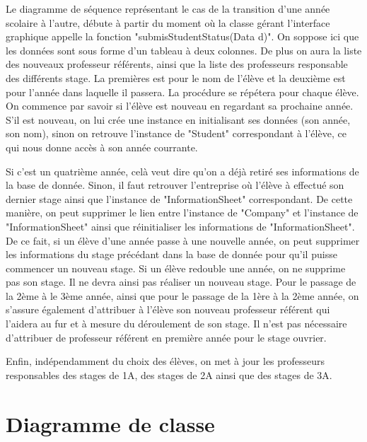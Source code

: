 \documentclass{scrreprt}
\begin{document}
	Le diagramme de séquence représentant le cas de la transition d'une année scolaire à l'autre, débute à partir du moment
où la classe gérant l'interface graphique appelle la fonction "submisStudentStatus(Data d)". On soppose ici que les données
sont sous forme d'un tableau à deux colonnes. De plus on aura la liste des nouveaux professeur référents, ainsi que la liste des professeurs
responsable des différents stage. La premières est pour le nom de l'élève et la deuxième est pour l'année dans laquelle
il passera. La procédure se répétera pour chaque élève. On commence par savoir si l'élève est nouveau en regardant sa prochaine année.
S'il est nouveau, on lui crée une instance en initialisant ses données (son année, son nom), sinon on retrouve l'instance de "Student" 
correspondant à l'élève, ce qui nous donne accès à son année courrante. 

	Si c'est un quatrième année, celà veut dire qu'on a déjà retiré ses informations de la base de donnée. Sinon, il faut retrouver 
l'entreprise où l'élève à effectué son dernier stage ainsi que l'instance de "InformationSheet" correspondant. De cette manière, on peut 
supprimer le lien entre l'instance de "Company" et l'instance de "InformationSheet" ainsi que réinitialiser les informations de 
"InformationSheet". De ce fait, si un élève d'une année passe à une nouvelle année, on peut supprimer les informations du stage précédant 
dans la base de donnée pour qu'il puisse commencer un nouveau stage. Si un élève redouble une année, on ne supprime pas son stage. Il ne 
devra ainsi pas réaliser un nouveau stage. Pour le passage de la 2ème à le 3ème année, ainsi que pour le passage de la 1ère à la 2ème année, 
on s'assure également d'attribuer à l'élève son nouveau professeur référent qui l'aidera au fur et à mesure du déroulement de son stage. 
Il n'est pas nécessaire d'attribuer de professeur référent en première année pour le stage ouvrier. 

	Enfin, indépendamment du choix des élèves, on met à jour les professeurs responsables des stages de 1A, des stages de 2A ainsi que 
des stages de 3A.  

\newpage

\newpage
\chapter{Diagramme de classe}


\end{document}
